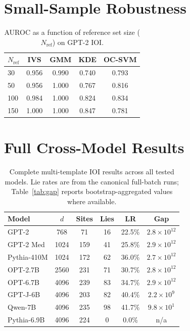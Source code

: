 \documentclass{article}
\begin{document}
\section{Small-Sample Robustness}
\label{app:small_sample}

\begin{table}[h]
\caption{AUROC as a function of reference set size ($N_\text{ref}$) on GPT-2 IOI.}
\begin{center}\small
\begin{tabular}{lcccc}
\toprule
$N_\text{ref}$ & IVS & GMM & KDE & OC-SVM \\
\midrule
30 & 0.956 & 0.990 & 0.740 & 0.793 \\
50 & 0.956 & 1.000 & 0.767 & 0.816 \\
100 & 0.984 & 1.000 & 0.824 & 0.834 \\
150 & 1.000 & 1.000 & 0.847 & 0.781 \\
\bottomrule
\end{tabular}
\end{center}
\end{table}

\section{Full Cross-Model Results}
\label{app:full}

\begin{table}[h]
\caption{Complete multi-template IOI results across all tested models. Lie rates are from the canonical full-batch runs; Table~\ref{tab:gap} reports bootstrap-aggregated values where available.}
\begin{center}\small
\begin{tabular}{lccccc}
\toprule
\textbf{Model} & $d$ & \textbf{Sites} & \textbf{Lies} & \textbf{LR} & \textbf{Gap} \\
\midrule
GPT-2 & 768 & 71 & 16 & 22.5\% & $2.8{\times}10^{12}$ \\
GPT-2 Med & 1024 & 159 & 41 & 25.8\% & $2.9{\times}10^{12}$ \\
Pythia-410M & 1024 & 172 & 62 & 36.0\% & $2.7{\times}10^{12}$ \\
OPT-2.7B & 2560 & 231 & 71 & 30.7\% & $2.8{\times}10^{12}$ \\
OPT-6.7B & 4096 & 239 & 83 & 34.7\% & $2.9{\times}10^{12}$ \\
GPT-J-6B & 4096 & 203 & 82 & 40.4\% & $2.2{\times}10^{9}$ \\
Qwen-7B & 4096 & 235 & 98 & 41.7\% & $9.8{\times}10^{1}$ \\
Pythia-6.9B & 4096 & 224 & 0 & 0.0\% & n/a \\
\bottomrule
\end{tabular}
\end{center}
\end{table}
\end{document}
